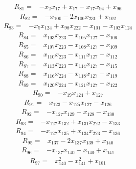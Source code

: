 \begin{align*}
 R_{81}={}&-x_{2}x_{17} +x_{17} -x_{17}x_{94} +x_{96}
\end{align*}
\begin{align*}
 R_{82}={}&-x_{100} -2x_{100}x_{231} +x_{102}
\end{align*}
\begin{align*}
 R_{83}={}&-x_{5}x_{124} +x_{98}x_{222} -x_{101} -x_{102}x_{124}
\end{align*}
\begin{align*}
 R_{84}={}&x_{103}x_{223} -x_{105}x_{127} -x_{106}
\end{align*}
\begin{align*}
 R_{85}={}&x_{107}x_{223} -x_{108}x_{127} -x_{109}
\end{align*}
\begin{align*}
 R_{86}={}&x_{110}x_{223} -x_{111}x_{127} -x_{112}
\end{align*}
\begin{align*}
 R_{87}={}&x_{113}x_{223} -x_{114}x_{127} -x_{115}
\end{align*}
\begin{align*}
 R_{88}={}&x_{116}x_{224} -x_{118}x_{127} -x_{119}
\end{align*}
\begin{align*}
 R_{89}={}&x_{120}x_{224} -x_{121}x_{127} -x_{122}
\end{align*}
\begin{align*}
 R_{90}={}&-x_{19}x_{124} +x_{127}
\end{align*}
\begin{align*}
 R_{91}={}&x_{123} -x_{125}x_{127} -x_{126}
\end{align*}
\begin{align*}
 R_{92}={}&-x_{127}x_{129} +x_{128} -x_{130}
\end{align*}
\begin{align*}
 R_{93}={}&-x_{127}x_{132} +x_{131}x_{222} -x_{133}
\end{align*}
\begin{align*}
 R_{94}={}&-x_{127}x_{135} +x_{134}x_{223} -x_{136}
\end{align*}
\begin{align*}
 R_{95}={}&x_{137} -2x_{137}x_{139} +x_{140}
\end{align*}
\begin{align*}
 R_{96}={}&-x_{137}x_{140} -x_{140} +x_{141}
\end{align*}
\begin{align*}
 R_{97}={}&x_{140}^{2} -x_{141}^{2} +x_{161}
\end{align*}
